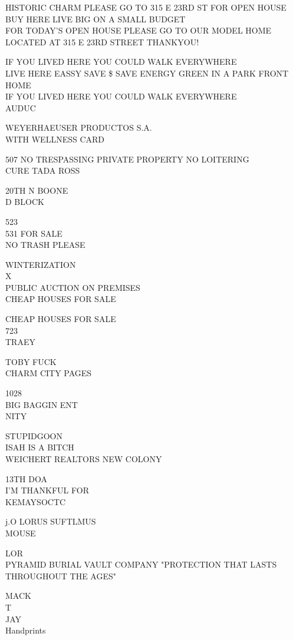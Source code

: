 \documentclass[10pt,letterpaper]{article}
\begin{document}
HISTORIC CHARM PLEASE GO TO 315 E 23RD ST FOR OPEN HOUSE\\
BUY HERE LIVE BIG ON A SMALL BUDGET\\
FOR TODAY'S OPEN HOUSE PLEASE GO TO OUR MODEL HOME LOCATED AT 315 E 23RD STREET THANKYOU!

IF YOU LIVED HERE YOU COULD WALK EVERYWHERE\\
LIVE HERE EASSY SAVE \$ SAVE ENERGY GREEN IN A PARK FRONT HOME\\
IF YOU LIVED HERE YOU COULD WALK EVERYWHERE\\
AUDUC

WEYERHAEUSER PRODUCTOS S.A.\\
WITH WELLNESS CARD

507 NO TRESPASSING PRIVATE PROPERTY NO LOITERING\\
CURE TADA ROSS

20TH N BOONE\\
D BLOCK

523\\
531 FOR SALE\\
NO TRASH PLEASE

WINTERIZATION\\
X\\
PUBLIC AUCTION ON PREMISES\\
CHEAP HOUSES FOR SALE

CHEAP HOUSES FOR SALE\\
723\\
TRAEY

TOBY FUCK\\
CHARM CITY PAGES

1028\\
BIG BAGGIN ENT\\
NITY

STUPIDGOON\\
ISAH IS A BITCH\\
WEICHERT REALTORS NEW COLONY

13TH DOA\\
I'M THANKFUL FOR\\
KEMAYSOCTC

j.O LORUS SUFTLMUS\\
MOUSE

LOR\\
PYRAMID BURIAL VAULT COMPANY "PROTECTION THAT LASTS THROUGHOUT THE AGES"

MACK\\
T\\
JAY\\
Handprints
\end{document}
